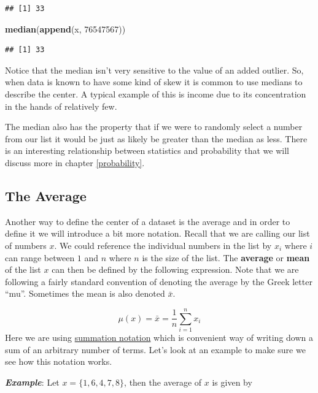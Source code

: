 \documentclass[]{book}
\newenvironment{Shaded}{\begin{snugshade}}{\end{snugshade}}
\newcommand{\DecValTok}[1]{\textcolor[rgb]{0.00,0.00,0.81}{#1}}
\newcommand{\KeywordTok}[1]{\textcolor[rgb]{0.13,0.29,0.53}{\textbf{#1}}}
\newcommand{\NormalTok}[1]{#1}
\begin{document}
\begin{verbatim}
## [1] 33
\end{verbatim}

\begin{Shaded}
\begin{Highlighting}[]
\KeywordTok{median}\NormalTok{(}\KeywordTok{append}\NormalTok{(x, }\DecValTok{76547567}\NormalTok{))}
\end{Highlighting}
\end{Shaded}

\begin{verbatim}
## [1] 33
\end{verbatim}

Notice that the median isn't very sensitive to the value of an added outlier. So, when data is known to have some kind of skew it is common to use medians to describe the center. A typical example of this is income due to its concentration in the hands of relatively few.

The median also has the property that if we were to randomly select a number from our list it would be just as likely be greater than the median as less. There is an interesting relationship between statistics and probability that we will discuss more in chapter \ref{probability}.

\hypertarget{the-average}{%
\subsection{The Average}\label{the-average}}

Another way to define the center of a dataset is the average and in order to define it we will introduce a bit more notation. Recall that we are calling our list of numbers \(x\). We could reference the individual numbers in the list by \(x_i\) where \(i\) can range between \(1\) and \(n\) where \(n\) is the size of the list. The \textbf{average} or \textbf{mean} of the list \(x\) can then be defined by the following expression. Note that we are following a fairly standard convention of denoting the average by the Greek letter ``mu''. Sometimes the mean is also denoted \(\bar{x}\).

\[\mu(x) = \bar{x} = \frac{1}{n} \sum_{i=1}^n x_i\]
Here we are using \href{https://en.wikipedia.org/wiki/Summation}{summation notation} which is convenient way of writing down a sum of an arbitrary number of terms. Let's look at an example to make sure we see how this notation works.

\emph{\textbf{Example}}: Let \(x = \{1, 6, 4, 7, 8\}\), then the average of \(x\) is given by
\end{document}
